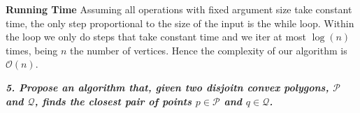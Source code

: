 \documentclass[a4paper, 10pt]{article}
\begin{document}
\textbf{Running Time} Assuming all operations with fixed argument size take constant time, the only step proportional to the size of the input is the while loop. Within the loop we only do steps that take constant time and we iter at most $\log(n)$ times, being $n$ the number of vertices. Hence the complexity of our algorithm is $\mathcal{O}(n)$.

\pagebreak 
\textbf{\textit{5. Propose an algorithm that, given two disjoitn convex polygons, $\mathcal{P}$ and $\mathcal{Q}$, finds the closest pair of points $p \in \mathcal{P}$ and $q \in \mathcal{Q}$.}}
\end{document}
